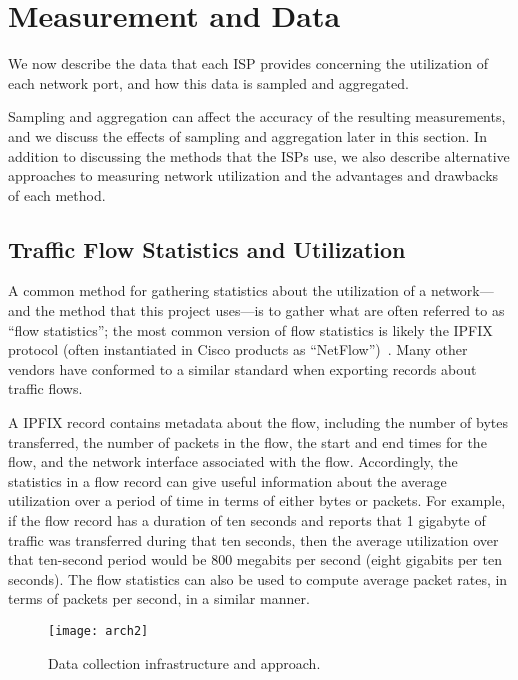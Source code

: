 \section{Measurement and Data}\label{sec:method}

We now describe the data that each ISP provides concerning the
utilization of each network port, and how this data is sampled and
aggregated.  

Sampling and aggregation can affect the accuracy of the
resulting measurements, and we discuss the effects of sampling and
aggregation later in this section.  In addition to discussing the
methods that the ISPs use, we also describe alternative approaches to
measuring network utilization and the advantages and drawbacks of each
method.


\subsection{Traffic Flow Statistics and Utilization}
A common method for gathering statistics about the utilization of a
network---and the method that this project uses---is to gather what are
often referred to as ``flow statistics''; the most common version of
flow statistics is likely the IPFIX protocol (often instantiated in
Cisco products as ``NetFlow'')~\cite{rfc7011}.  Many other vendors have conformed to a
similar standard when exporting records about traffic flows.

A IPFIX record contains metadata about the flow, including the number
of bytes transferred, the number of packets in the flow, the start and
end times for the flow, and the network interface associated with the
flow.  Accordingly, the statistics in a flow record can give useful
information about the average utilization over a period of time in terms
of either bytes or packets.  For example, if the flow record has a
duration of ten seconds and reports that 1 gigabyte of traffic was
transferred during that ten seconds, then the average utilization over
that ten-second period would be 800 megabits per second (eight gigabits
per ten seconds).  The flow statistics can also be used to compute
average packet rates, in terms of packets per second, in a similar
manner. 


\begin{figure}[t]
\texttt{[image: arch2]}
\caption{Data collection
  infrastructure and approach.} 
\label{fig:arch}
\end{figure}

